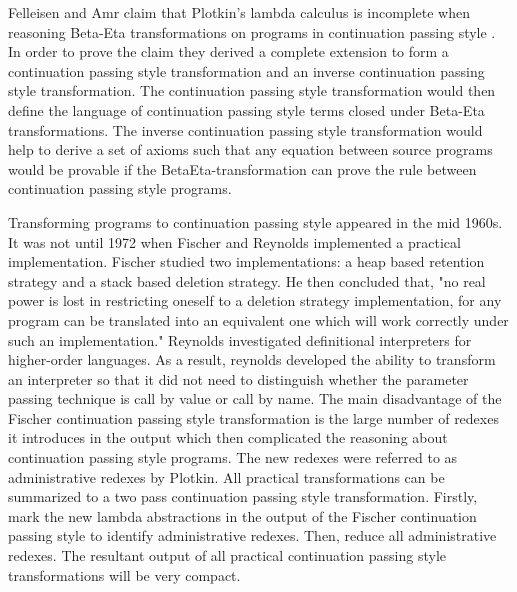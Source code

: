 
\usepackage{algorithm}
\usepackage{listings}
\usepackage{graphicx,amssymb,amsmath}
\usepackage{epstopdf}
\usepackage{setspace}
\sloppy

\oddsidemargin 0in
\evensidemargin 0in
\textwidth 6.5in
\topmargin -0.5in
\textheight 9.0in



\def \cps {continuation passing style }


\pagestyle{myheadings}  %
	 	
\doublespacing
Felleisen and Amr claim that Plotkin's lambda calculus is incomplete when reasoning Beta-Eta transformations on programs in \cps.  In order to prove the claim they derived a complete extension to form a \cps transformation and an inverse \cps transformation.  The \cps transformation would then define the language of \cps terms closed under Beta-Eta transformations.  The inverse \cps transformation would help to derive a set of axioms such that any equation between source programs would be provable if the BetaEta-transformation can prove the rule between \cps programs.

Transforming programs to \cps appeared in the mid 1960s. It was not until 1972 when Fischer and Reynolds implemented a practical implementation. Fischer studied two implementations: a heap based retention strategy and a stack based deletion strategy. He then concluded that, "no real power is lost in restricting oneself to a deletion strategy implementation, for any program can be translated into an equivalent one which will work correctly under such an implementation." Reynolds investigated definitional interpreters for higher-order languages. As a result, reynolds developed the ability to transform an interpreter so that it did not need to distinguish whether the parameter passing technique is call by value or call by name. The main disadvantage of the Fischer \cps transformation is the large number of redexes it introduces in the output which then complicated the reasoning about \cps programs. The new redexes were referred to as administrative redexes by Plotkin. All practical transformations can be summarized to a two pass \cps transformation. Firstly, mark the new lambda abstractions in the output of the Fischer \cps to identify administrative redexes. Then, reduce all administrative redexes. The resultant output of all practical \cps transformations will be very compact.

